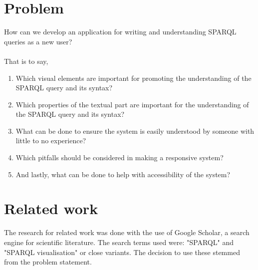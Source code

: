 \section{Problem}
How can we develop an application for writing and understanding SPARQL queries as a new user?
\\\\
That is to say,
\begin{enumerate}
    \item Which visual elements are important for promoting the understanding of the SPARQL query and its syntax?
    \item Which properties of the textual part are important for the understanding of the SPARQL query and its syntax?
    \item What can be done to ensure the system is easily understood by someone with little to no experience?
    \item Which pitfalls should be considered in making a responsive system?
    \item And lastly, what can be done to help with accessibility of the system?
\end{enumerate}

\section{Related work}
The research for related work was done with the use of Google Scholar, a search engine for scientific literature. The search terms used were: "SPARQL" and "SPARQL visualisation" or close variants. The decision to use these stemmed from the problem statement.
